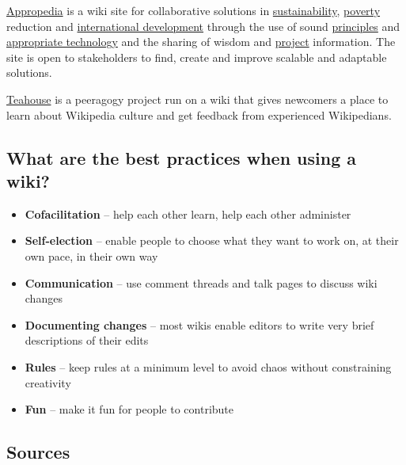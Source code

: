 \href{http://www.appropedia.org/Welcome\_to\_Appropedia}{Appropedia} is
a wiki site for collaborative solutions in
\href{http://www.appropedia.org/Sustainability}{sustainability},
\href{http://www.appropedia.org/Poverty}{poverty} reduction and
\href{http://www.appropedia.org/International\_development}{international
development} through the use of sound
\href{http://www.appropedia.org/Principles}{principles} and
\href{http://www.appropedia.org/Appropriate\_technology}{appropriate
technology} and the sharing of wisdom and
\href{http://www.appropedia.org/Project}{project} information. The site
is open to stakeholders to find, create and improve scalable and
adaptable solutions.

\href{http://en.wikipedia.org/wiki/Wikipedia:Teahouse}{Teahouse} is a
peeragogy project run on a wiki that gives newcomers a place to learn
about Wikipedia culture and get feedback from experienced Wikipedians.

\subsection{What are the best practices when using a wiki?}

\begin{itemize}
\item
  \textbf{Cofacilitation} -- help each other learn, help each other
  administer
\item
  \textbf{Self-election} -- enable people to choose what they want to
  work on, at their own pace, in their own way
\item
  \textbf{Communication} -- use comment threads and talk pages to
  discuss wiki changes
\item
  \textbf{Documenting changes} -- most wikis enable editors to write
  very brief descriptions of their edits
\item
  \textbf{Rules} -- keep rules at a minimum level to avoid chaos without
  constraining creativity
\item
  \textbf{Fun} -- make it fun for people to contribute
\end{itemize}
\subsection{Sources}

